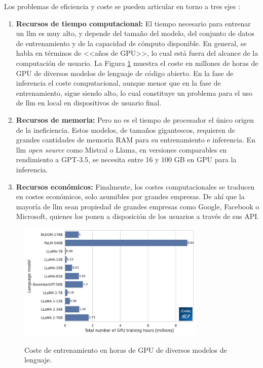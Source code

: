Los problemas de eficiencia y coste se pueden articular en torno a tres ejes \citep{arunbijiRAGVsFinetuning}:

\begin{enumerate}[label=\alph*)]
    \item \textbf{Recursos de tiempo computacional:} El tiempo necesario para entrenar un \gls{llm} es muy alto, y depende del tamaño del modelo, del conjunto de datos de entrenamiento y de la capacidad de cómputo disponible. En general, se habla en términos de <<años de GPU>>, lo cual está fuera del alcance de la computación de usuario. La Figura \ref{fig:llm_gpu_training_hours} muestra el coste en millones de horas de GPU de diversos modelos de lenguaje de código abierto. En la fase de inferencia el coste computacional, aunque menor que en la fase de entrenamiento, sigue siendo alto, lo cual constituye un problema para el uso de \gls{llm} en local en dispositivos de usuario final.
    \item \textbf{Recursos de memoria:} Pero no es el tiempo de procesador el único origen de la ineficiencia. Estos modelos, de tamaños gigantescos, requieren de grandes cantidades de memoria RAM para su entrenamiento e inferencia. En \gls{llm} \textit{open source} como Mistral o Llama, en versiones comparables en rendimiento a GPT-3.5, se necesita entre 16 y 100 GB en GPU para la inferencia. 
    \item \textbf{Recursos económicos:} Finalmente, los costes computacionales se traducen en costes económicos, solo asumibles por grandes empresas. De ahí que la mayoría de \gls{llm} sean propiedad de grandes empresas como Google, Facebook o Microsoft, quienes los ponen a disposición de los usuarios a través de sus API.
\end{enumerate}

\begin{figure}[H]
    \caption[Coste de entrenamiento en horas de GPU de diversos modelos de lenguaje]{Coste de entrenamiento en horas de GPU de diversos modelos de lenguaje.}
    \centering
    \includegraphics[width=0.8\textwidth]{./figuras/llm_gpu_training_hours.png}
    \label{fig:llm_gpu_training_hours}
  \end{figure}

